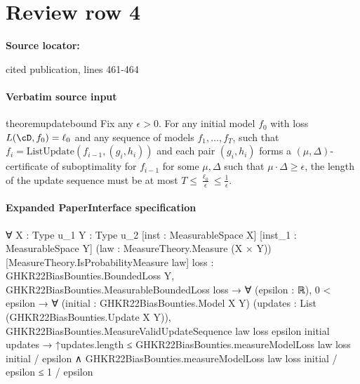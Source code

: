 \documentclass[10pt]{article}
\begin{document}
\section*{Review row 4}
\textbf{Source locator:} {\footnotesize\raggedright cited publication, lines 461-\allowbreak{}464\par}
\paragraph{Verbatim source input}
\begin{ReviewVerbatim}
\begin{restatable}{theorem}{updatebound}
\label{thm:updatebound}
Fix any $\epsilon > 0$. For any initial model $f_0$ with loss $L(\cD,f_0) = \ell_0$ and any sequence of models $f_1,\ldots,f_T$, such that $f_i = \textrm{ListUpdate}(f_{i-1},(g_{i},h_{i}))$ and each pair $(g_i,h_{i})$ forms a $(\mu,\Delta)$-certificate of suboptimality for $f_{i-1}$ for some $\mu, \Delta$ such that  $\mu\cdot \Delta \geq \epsilon$, the length of the update sequence must be at most $T \leq \frac{\ell_0}{\epsilon} \leq \frac{1}{\epsilon}$.
\end{restatable}
\end{ReviewVerbatim}



\paragraph{Expanded PaperInterface specification}
\begin{ReviewVerbatim}
∀ {X : Type u_1} {Y : Type u_2} [inst : MeasurableSpace X] [inst_1 : MeasurableSpace Y]
  (law : MeasureTheory.Measure (X × Y)) [MeasureTheory.IsProbabilityMeasure law]
  {loss : GHKR22BiasBounties.BoundedLoss Y},
  GHKR22BiasBounties.MeasurableBoundedLoss loss →
    ∀ (epsilon : ℝ),
      0 < epsilon →
        ∀ (initial : GHKR22BiasBounties.Model X Y) (updates : List (GHKR22BiasBounties.Update X Y)),
          GHKR22BiasBounties.MeasureValidUpdateSequence law loss epsilon initial updates →
            ↑updates.length ≤ GHKR22BiasBounties.measureModelLoss law loss initial / epsilon ∧
              GHKR22BiasBounties.measureModelLoss law loss initial / epsilon ≤ 1 / epsilon
\end{ReviewVerbatim}
\end{document}
